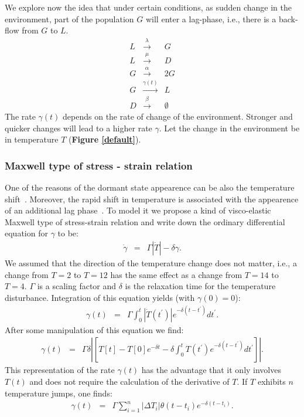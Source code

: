 \documentclass[10pt,A4paper]{article}
\begin{document}


We explore now the idea that under certain conditions, as sudden change in the environment, part of the population $G$ will enter a lag-phase, i.e., there is a back-flow from $G$ to $L$. 
\begin{eqnarray}
    L &\stackrel{\lambda}{\longrightarrow} & G\\
    L &\stackrel{\mu}{\longrightarrow} & D\\
    G &\stackrel{\alpha}{\longrightarrow} & 2G\\
    G &\stackrel{\gamma(t)}{\longrightarrow} & L\\
    D &\stackrel{\beta}{\longrightarrow} & \emptyset
\end{eqnarray}
The rate $\gamma(t)$ depends on the rate of change of the environment. Stronger and quicker changes will lead to a higher rate $\gamma$. 
Let the change in the environment be in temperature $T$ (\textbf{Figure \ref{default}}).

\subsubsection{Maxwell type of stress - strain relation}

One of the reasons of the dormant state appearence can be also the temperature shift~\cite{oliver_viable_1995}.
Moreover, the rapid shift in temperature is associated with the appearence of an additional lag phase~\cite{zwietering_modeling_1994}.
To model it we propose a kind of visco-elastic Maxwell type of stress-strain relation and write down the ordinary differential equation for $\gamma$ to be:
\begin{eqnarray}
\dot{\gamma} &=& \Gamma \left |\dot{T}\right |-\delta \gamma.
\end{eqnarray}
We assumed that the direction of the temperature change does not matter, i.e., a change from $T=2$ to $T=12$ has the same effect as a change from $T=14$ to $T=4$. 
$\Gamma$ is a scaling factor and $\delta$ is the relaxation time for the temperature disturbance. 
Integration of this equation yields (with $\gamma(0)=0$):
\begin{eqnarray}
\gamma(t) &=& \Gamma \int_0^t \left |\dot{T}(t^{\prime})\right |e^{-\delta (t-t^{\prime})}dt^{\prime}.
\end{eqnarray}
After some manipulation of this equation we find:
\begin{eqnarray}
\gamma(t) &=& \Gamma\delta\left |\left[T[t]-T[0]e^{-\delta t}-\delta \int_0^t T(t^{\prime})e^{-\delta (t-t^{\prime})}dt^{\prime}\right]\right |.
\end{eqnarray}
This representation of the rate $\gamma(t)$ has the advantage that it only involves $T(t)$ and does not require the calculation of the derivative of $T$. 
If $T$ exhibits $n$ temperature jumps, one finds:
\begin{eqnarray}
\gamma(t) &=& \Gamma\sum_{i=1}^n \left |\Delta T_i \right |\theta(t-t_i)e^{-\delta(t-t_i)}.
\end{eqnarray}
\end{document}

